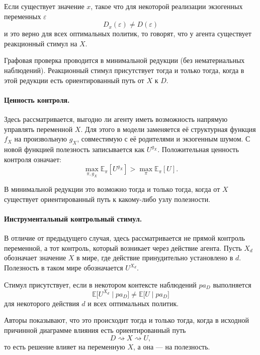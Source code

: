 Если существует значение $x$, такое что для некоторой реализации экзогенных 
переменных $\varepsilon$
\begin{equation}
    D_x(\varepsilon) \neq D(\varepsilon)
\end{equation}
и это верно для всех оптимальных политик,  
то говорят, что у агента существует реакционный стимул на $X$.

Графовая проверка проводится в минимальной редукции (без нематериальных наблюдений).  
Реакционный стимул присутствует тогда и только тогда,  
когда в этой редукции есть ориентированный путь от $X$ к $D$.


\paragraph{Ценность контроля.}  
Здесь рассматривается, выгодно ли агенту иметь возможность напрямую управлять переменной $X$.
Для этого в модели заменяется её структурная функция $f_X$ на произвольную $g_X$,  
совместимую с её родителями и экзогенным шумом.  
С новой функцией полезность записывается как $U^{g_X}$.  
Положительная ценность контроля означает:
\begin{equation}
    \max_{\pi, g_X} \mathbb{E}_{\pi}[U^{g_X}] > \max_{\pi} \mathbb{E}_{\pi}[U].
\end{equation}

В минимальной редукции это возможно тогда и только тогда,  
когда от $X$ существует ориентированный путь к какому-либо узлу полезности.  

\paragraph{Инструментальный контрольный стимул.}  
В отличие от предыдущего случая, здесь рассматривается не прямой контроль переменной,  
а тот контроль, который возникает через действие агента.  
Пусть $X_d$ обозначает значение $X$ в мире, где действие принудительно установлено в $d$.  
Полезность в таком мире обозначается $U^{X_d}$.

Стимул присутствует, если в некотором контексте наблюдений $pa_D$ выполняется
\begin{equation}
    \mathbb{E}\bigl[U^{X_d} \mid pa_D\bigr] \neq \mathbb{E}\bigl[U \mid pa_D\bigr]
\end{equation}
для некоторого действия $d$ и всех оптимальных политик.

Авторы показывают, что это происходит тогда и только тогда,  
когда в исходной причинной диаграмме влияния есть ориентированный путь
\begin{equation}
    D \rightsquigarrow X \rightsquigarrow U,
\end{equation}
то есть решение влияет на переменную $X$, а она — на полезность.  

